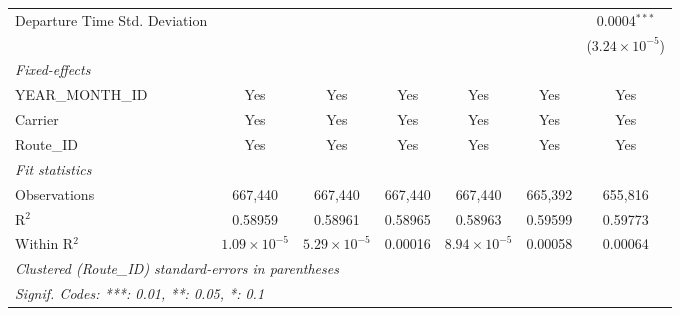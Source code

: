 \documentclass[preprint,12pt,authoryear]{elsarticle}
\begin{document}
\begin{table}
\begin{tabular}{lcccccc}
      Departure Time Std. Deviation     &                       &                       &                &                       &                 & 0.0004$^{***}$\\   
                                        &                       &                       &                &                       &                 & ($3.24\times 10^{-5}$)\\    
      \midrule
      \emph{Fixed-effects}\\
      YEAR\_MONTH\_ID                   & Yes                   & Yes                   & Yes            & Yes                   & Yes             & Yes\\  
      Carrier                           & Yes                   & Yes                   & Yes            & Yes                   & Yes             & Yes\\  
      Route\_ID                         & Yes                   & Yes                   & Yes            & Yes                   & Yes             & Yes\\  
      \midrule
      \emph{Fit statistics}\\
      Observations                      & 667,440               & 667,440               & 667,440        & 667,440               & 665,392         & 655,816\\  
      R$^2$                             & 0.58959               & 0.58961               & 0.58965        & 0.58963               & 0.59599         & 0.59773\\  
      Within R$^2$                      & $1.09\times 10^{-5}$  & $5.29\times 10^{-5}$  & 0.00016        & $8.94\times 10^{-5}$  & 0.00058         & 0.00064\\  
      \midrule \midrule
      \multicolumn{7}{l}{\emph{Clustered (Route\_ID) standard-errors in parentheses}}\\
      \multicolumn{7}{l}{\emph{Signif. Codes: ***: 0.01, **: 0.05, *: 0.1}}\\
   \end{tabular}
\end{table}
\end{document}
